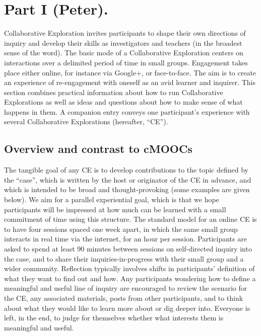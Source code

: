 \section*{Part I (Peter).}\label{part-i-peter.}

Collaborative Exploration invites participants to shape their own
directions of inquiry and develop their skills as investigators and
teachers (in the broadest sense of the word). The basic mode of a
Collaborative Exploration centers on interactions over a delimited
period of time in small groups. Engagement takes place either online,
for instance via Google+, or face-to-face. The aim is to create an
experience of re-engagement with oneself as an avid learner and
inquirer. This section combines practical information about how to run
Collaborative Explorations as well as ideas and questions about how to
make sense of what happens in them. A companion entry conveys one
participant's experience with several Collaborative Explorations
(hereafter, ``CE'').

\subsection{Overview and contrast to
cMOOCs}\label{overview-and-contrast-to-cmoocs}

The tangible goal of any CE is to develop contributions to the topic
defined by the ``case'', which is written by the host or originator of
the CE in advance, and which is intended to be broad and
thought-provoking (some examples are given below). We aim for a parallel
experiential goal, which is that we hope participants will be impressed
at how much can be learned with a small commitment of time using this
structure. The standard model for an online CE is to have four sessions
spaced one week apart, in which the same small group interacts in real
time via the internet, for an hour per session. Participants are asked
to spend at least 90 minutes between sessions on self-directed inquiry
into the case, and to share their inquiries-in-progress with their small
group and a wider community. Reflection typically involves shifts in
participants' definition of what they want to find out and how. Any
participants wondering how to define a meaningful and useful line of
inquiry are encouraged to review the scenario for the CE, any associated
materials, posts from other participants, and to think about what they
would like to learn more about or dig deeper into. Everyone is left, in
the end, to judge for themselves whether what interests them is
meaningful and useful. 

